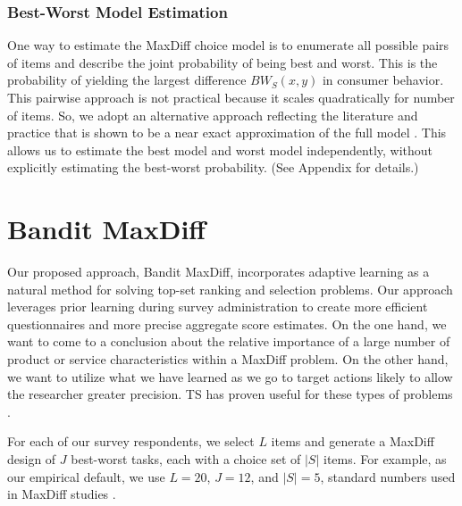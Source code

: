 \documentclass[nonblindrev]{informs3}
\newcommand{\numperset}{L}
\begin{document}
\subsubsection{Best-Worst Model Estimation}

One way to estimate the MaxDiff choice model is to enumerate all possible pairs of items and describe the joint probability of being best and worst. This is the probability of yielding the largest difference $BW_S(x,y)$ in consumer behavior. This pairwise approach is not practical because it scales quadratically for number of items. So, we adopt an alternative approach reflecting the literature and practice that is shown to be a near exact approximation of the full model \cite{cohen2003maximum}. This allows us to estimate the best model and worst model independently, without explicitly estimating the best-worst probability. (See Appendix for details.)


\section{Bandit MaxDiff}


Our proposed approach, Bandit MaxDiff, incorporates adaptive learning as a natural method for solving top-set ranking and selection problems. Our approach leverages prior learning during survey administration to create more efficient questionnaires and more precise aggregate score estimates. On the one hand, we want to come to a conclusion about the relative importance of a large number of product or service characteristics within a MaxDiff problem. On the other hand, we want to utilize what we have learned as we go to target actions likely to allow the researcher greater precision. TS has proven useful for these types of problems \citep{schwartzetal2017,russo2017tutorial}.

For each of our survey respondents, we select $\numperset$ items and generate a MaxDiff design of $J$ best-worst tasks, each with a choice set of $|S|$ items. For example, as our empirical default, we use $\numperset=20$, $J=12$, and $|S|=5$, standard numbers used in MaxDiff studies \citep{wirth2012largeset}. 
\end{document}
